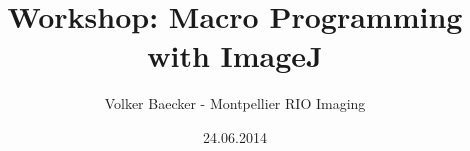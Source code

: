 \documentclass{book}
\begin{document}
\title{Workshop: Macro Programming with ImageJ}

\author{Volker Baecker \-- Montpellier RIO Imaging}
\date{24.06.2014}
\maketitle
\tableofcontents
\listoffigures





\end{document}

